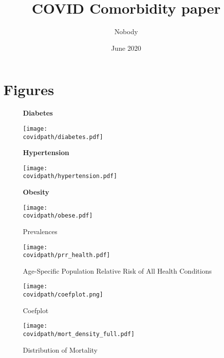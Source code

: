 \documentclass[12pt,letterpaper]{article}
\title{COVID Comorbidity paper} \author{Nobody}
\numberwithin{equation}{section}
\begin{document}
\date{June 2020}

\section{Figures}

\begin{figure}[H]
  \begin{center}
    \caption{Prevalences}
    
    \textbf{Diabetes}
    
    \texttt{[image: \\covidpath/diabetes.pdf]}

    \textbf{Hypertension}
    
    \texttt{[image: \\covidpath/hypertension.pdf]}

    \textbf{Obesity}
    
    \texttt{[image: \\covidpath/obese.pdf]}
    
  \end{center}
\end{figure}

\begin{figure}[H]
  \begin{center}
    \caption{Age-Specific Population Relative Risk of All Health Conditions}
    \texttt{[image: \\covidpath/prr\_health.pdf]}
  \end{center}
\end{figure}

\begin{figure}[H]
  \begin{center}
    \caption{Coefplot}
    \texttt{[image: \\covidpath/coefplot.png]}
  \end{center}
\end{figure}

\begin{figure}[H]
  \begin{center}
    \caption{Distribution of Mortality}
    \texttt{[image: \\covidpath/mort\_density\_full.pdf]}
  \end{center}
\end{figure}

\begin{table}[H]
  \begin{center}
    \caption{}
    
  \end{center}
\end{table}

\begin{table}[H]
  \begin{center}
    \caption{}
    
  \end{center}
\end{table}
\end{document}
